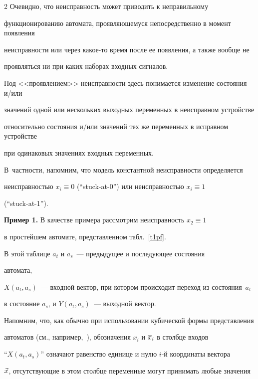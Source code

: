 \begin{multicols}{2}
 Очевидно, что неисправность может приводить к неправильному


функционированию автомата, проявляющемуся непосредственно в момент появления


неисправности или через какое-то время после ее появления, а также вообще не


проявляться ни при каких наборах входных сигналов.


Под <<проявлением>> неисправности здесь понимается изменение состояния и/или


значений одной или нескольких выходных переменных в неисправном устройстве


относительно состояния и/или значений тех же переменных в исправном устройстве


при одинаковых значениях входных переменных.


В~частности, напомним, что модель константной неисправности определяется


неисправностью $x_i \equiv 0$ (``stuck-at-0'') или неисправностью $x_i \equiv 1$


(``stuck-at-1'').





\medskip





\noindent


{\bf Пример 1.} В качестве примера рассмотрим неисправность $x_2 \equiv 1$


в простейшем автомате, пред\-став\-лен\-ном табл.~\ref{t1pf}.








В этой таблице $a_t$ и $a_s$~--- предыдущее и последующее состояния


автомата,


$X(a_t,a_s)$~--- входной вектор, при котором происходит переход из состояния~$a_t$


в состояние $a_s$, и $Y(a_t,a_s)$~--- выходной вектор.


Напомним, что, как обычно при использовании кубической формы представления


автоматов (см., например,~\cite{2, 8}), обозначения $x_i$ и $\overline x_i$ в столбце входов


``$X(a_t,a_s)$'' означают равенство единице и нулю $i$-й координаты вектора


$\vec x$, отсутствующие в этом столбце переменные могут принимать любые значения



\end{multicols}
